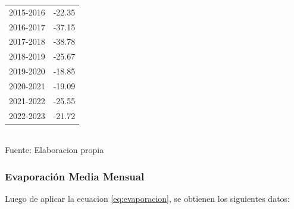 \documentclass{article} %
\begin{document}
\begin{table}[ht]
\begin{tabular}{|c|c|}
        2015-2016 & -22.35 \\
        2016-2017 & -37.15 \\
        2017-2018 & -38.78 \\
        2018-2019 & -25.67 \\
        2019-2020 & -18.85 \\
        2020-2021 & -19.09 \\
        2021-2022 & -25.55 \\
        2022-2023 & -21.72 \\
        \hline
    \end{tabular}
    \label{tab:precipitaciones_anuales}
    \vspace{0.2cm}
    \\Fuente: Elaboracion propia
\end{table}

\subsubsection{Evaporación Media Mensual}

Luego de aplicar la ecuacion \ref{eq:evaporacion}, se obtienen los siguientes datos:
\end{document}
